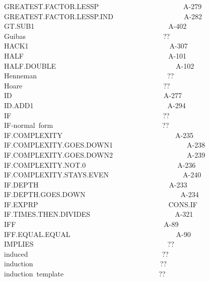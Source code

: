 \documentclass[11pt]{book}
\newenvironment{pubasis}{\begin{flushleft}\ttfamily\small}{\normalsize\rmfamily\end{flushleft}}
\begin{document}
\begin{pubasis}
GREAT\-EST.FAC\-TOR.LESSP~~~~~~~~~~~~~~~~~~~~~~~~A-279\\
GREAT\-EST.FAC\-TOR.LESSP.IND~~~~~~~~~~~~~~~~~~~~A-282\\
GT.SUB1~~~~~~~~~~~~~~~~~~~~~~~~~~~~~~~~~~~~~~A-402\\
Guibas~~~~~~~~~~~~~~~~~~~~~~~~~~~~~~~~~~~~~~~??\\
HACK1~~~~~~~~~~~~~~~~~~~~~~~~~~~~~~~~~~~~~~~~A-307\\
HALF~~~~~~~~~~~~~~~~~~~~~~~~~~~~~~~~~~~~~~~~~A-101\\
HALF.DOUBLE~~~~~~~~~~~~~~~~~~~~~~~~~~~~~~~~~~A-102\\
Henneman~~~~~~~~~~~~~~~~~~~~~~~~~~~~~~~~~~~~~??\\
Hoare~~~~~~~~~~~~~~~~~~~~~~~~~~~~~~~~~~~~~~~~??\\
ID~~~~~~~~~~~~~~~~~~~~~~~~~~~~~~~~~~~~~~~~~~~A-277\\
ID.ADD1~~~~~~~~~~~~~~~~~~~~~~~~~~~~~~~~~~~~~~A-294\\
IF~~~~~~~~~~~~~~~~~~~~~~~~~~~~~~~~~~~~~~~~~~~??\\
IF-normal~form~~~~~~~~~~~~~~~~~~~~~~~~~~~~~~~??\\
IF.COM\-PLEX\-I\-TY~~~~~~~~~~~~~~~~~~~~~~~~~~~~~~~~A-235\\
IF.COM\-PLEX\-I\-TY.GOES.DOWN1~~~~~~~~~~~~~~~~~~~~~A-238\\
IF.COM\-PLEX\-I\-TY.GOES.DOWN2~~~~~~~~~~~~~~~~~~~~~A-239\\
IF.COM\-PLEX\-I\-TY.NOT.0~~~~~~~~~~~~~~~~~~~~~~~~~~A-236\\
IF.COM\-PLEX\-I\-TY.STAYS.EVEN~~~~~~~~~~~~~~~~~~~~~A-240\\
IF.DEPTH~~~~~~~~~~~~~~~~~~~~~~~~~~~~~~~~~~~~~A-233\\
IF.DEPTH.GOES.DOWN~~~~~~~~~~~~~~~~~~~~~~~~~~~A-234\\
IF.EXPRP~~~~~~~~~~~~~~~~~~~~~~~~~~~~~~~~~~~~~CONS.IF\\
IF.TIMES.THEN.DIVIDES~~~~~~~~~~~~~~~~~~~~~~~~A-321\\
IFF~~~~~~~~~~~~~~~~~~~~~~~~~~~~~~~~~~~~~~~~~~A-89\\
IFF.EQUAL.EQUAL~~~~~~~~~~~~~~~~~~~~~~~~~~~~~~A-90\\
IMPLIES~~~~~~~~~~~~~~~~~~~~~~~~~~~~~~~~~~~~~~??\\
induced~~~~~~~~~~~~~~~~~~~~~~~~~~~~~~~~~~~~~~??\\
induction~~~~~~~~~~~~~~~~~~~~~~~~~~~~~~~~~~~~??\\
induction~template~~~~~~~~~~~~~~~~~~~~~~~~~~~??\\

\end{pubasis}
\end{document}
